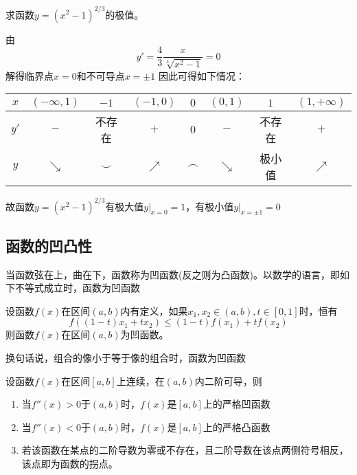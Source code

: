 \begin{example}
    求函数$y=(x^2-1)^{2/3}$的极值。
\end{example}
\begin{solution}
    由
    \[ y'=\frac{4}{3}\frac{x}{\sqrt[3]{x^2-1}}=0 \]
    解得临界点$x=0$和不可导点$x=\pm 1$
    因此可得如下情况：
    \begin{center}
        \begin{tabular}{|c|c|c|c|c|c|c|c|}
            \hline
            $x$  & $(-\infty,1)$ & $-1$     & $(-1,0)$   & $0$      & $(0,1)$    & $1$    & $(1,+\infty)$ \\ \hline
            $y'$ & $-$           & 不存在   & $+$        & $0$      & $-$        & 不存在 & $+$           \\ \hline
            $y$  & $\searrow$    & $\smile$ & $\nearrow$ & $\frown$ & $\searrow$ & 极小值 & $\nearrow$    \\ \hline
        \end{tabular}
    \end{center}
    故函数$y=(x^2-1)^{2/3}$有极大值$y|_{x=0}=1$，有极小值$y|_{x=\pm 1}=0$
\end{solution}

\subsection{函数的凹凸性}
当函数弦在上，曲在下，函数称为凹函数(反之则为凸函数)。以数学的语言，即如下不等式成立时，函数为凹函数
\begin{definition}
    设函数$f(x)$在区间$(a,b)$内有定义，如果$x_1,x_2\in(a,b), t \in [0,1]$时，恒有
    \[ f((1-t)x_1+tx_2)\leq (1-t)f(x_1)+tf(x_2) \]
    则函数$f(x)$在区间$(a,b)$为凹函数。
\end{definition}
换句话说，组合的像小于等于像的组合时，函数为凹函数

\begin{theorem}
    设函数$f(x)$在区间$[a,b]$上连续，在$(a,b)$内二阶可导，则
    \begin{enumerate}
        \item 当$f''(x)>0$于$(a,b)$时，$f(x)$是$[a,b]$上的严格凹函数
        \item 当$f''(x)<0$于$(a,b)$时，$f(x)$是$[a,b]$上的严格凸函数
        \item 若该函数在某点的二阶导数为零或不存在，且二阶导数在该点两侧符号相反，该点即为函数的拐点。
    \end{enumerate}
\end{theorem}

